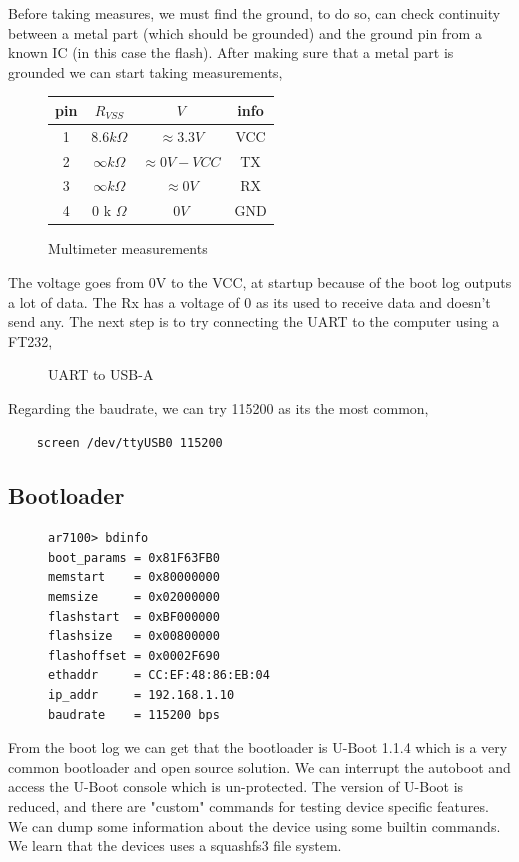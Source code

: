 \documentclass{article}
\begin{document}
\noindent Before taking measures, we must find the ground, to do so, can check continuity between a metal part (which should be grounded) and the ground pin from a known IC (in this case the flash). After making sure that a metal part is grounded we can start taking measurements,
\begin{figure}[!ht]
	\centering
	\begin{tabular}{|c|c|c|c|}
		\hline
		pin & $R_{VSS}$ & $V$ & info \\ 
		\hline
		1 & $8.6k\Omega$ & $\approx 3.3V$ & VCC \\
		2 & $\infty k\Omega$ & $\approx 0V - VCC$ & TX\\
		3 & $\infty k\Omega$ & $\approx 0V$ & RX \\
		4 & $0$ k $\Omega$ & $0V$ & GND \\
		\hline
	\end{tabular}
	\caption{Multimeter measurements}
\end{figure}

\noindent The voltage goes from 0V to the VCC, at startup because of the boot log outputs a lot of data. The Rx has a voltage of 0 as its used to receive data and doesn't send any. The next step is to try connecting the UART to the computer using a FT232, 
\begin{figure}[!ht]
	\centering
	
	\caption{UART to USB-A }
\end{figure}

\noident Regarding the baudrate, we can try 115200 as its the most common,
\begin{verbatim}
	screen /dev/ttyUSB0 115200
\end{verbatim} 
\subsection{Bootloader}
\begin{figure}[!ht]
\begin{verbatim}
ar7100> bdinfo
boot_params = 0x81F63FB0
memstart    = 0x80000000
memsize     = 0x02000000
flashstart  = 0xBF000000
flashsize   = 0x00800000
flashoffset = 0x0002F690
ethaddr     = CC:EF:48:86:EB:04
ip_addr     = 192.168.1.10
baudrate    = 115200 bps	
\end{verbatim}
\end{figure}
From the boot log we can get that the bootloader is U-Boot 1.1.4 which is a very common bootloader and open source solution. We can interrupt the autoboot and access the U-Boot console which is un-protected. The version of U-Boot is reduced, and there are "custom" commands for testing device specific features. We can dump some information about the device using some builtin commands. We learn that the devices uses a squashfs3 file system. 
\end{document}
